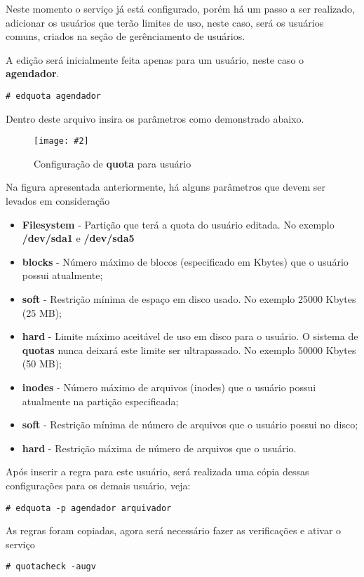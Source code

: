 \documentclass[
	12pt,				%
	openany,			%
	a4paper,			%
	chapter=TITLE,		%
	section=TITLE,		%
	english,
	brazil				%
]{abntex2}
\newcommand{\includeImage}[3] {

\begin{figure}[H]
 	 \centering
  		\texttt{[image: \#2]}
  	\caption{#3}
\end{figure}

}
\begin{document}
Neste momento o serviço já está configurado, porém há um passo a ser realizado, adicionar os usuários que terão limites de uso, neste caso, será os usuários comuns, criados na seção de gerênciamento de usuários.

A edição será inicialmente feita apenas para um usuário, neste caso o \textbf{agendador}.
\begin{lstlisting}
# edquota agendador
\end{lstlisting}

Dentro deste arquivo insira os parâmetros como demonstrado abaixo.
\includeImage{0.7}{imgs/3_configuracao_quota/2.png}{Configuração de \textbf{quota} para usuário}

Na figura apresentada anteriormente, há alguns parâmetros que devem ser levados em consideração

\begin{itemize}
	\item \textbf{Filesystem} - Partição que terá a quota do usuário editada. No exemplo \textbf{/dev/sda1} e \textbf{/dev/sda5}
    \item \textbf{blocks} - Número máximo de blocos (especificado em Kbytes) que o usuário possui atualmente;
    \item \textbf{soft} - Restrição mínima de espaço em disco usado. No exemplo 25000 Kbytes (25 MB);
    \item \textbf{hard} - Limite máximo aceitável de uso em disco para o usuário. O sistema de \textbf{quotas} nunca deixará este limite ser ultrapassado. No exemplo 50000 Kbytes (50 MB);
    \item \textbf{inodes} - Número máximo de arquivos (inodes) que o usuário possui atualmente na partição especificada;
    \item \textbf{soft} - Restrição mínima de número de arquivos que o usuário possui no disco;
    \item \textbf{hard} - Restrição máxima de número de arquivos que o usuário.
\end{itemize}

Após inserir a regra para este usuário, será realizada uma cópia dessas configurações para os demais usuário, veja:

\begin{lstlisting}
# edquota -p agendador arquivador
\end{lstlisting}

As regras foram copiadas, agora será necessário fazer as verificações e ativar o serviço

\begin{lstlisting}
# quotacheck -augv
\end{lstlisting}
\end{document}
